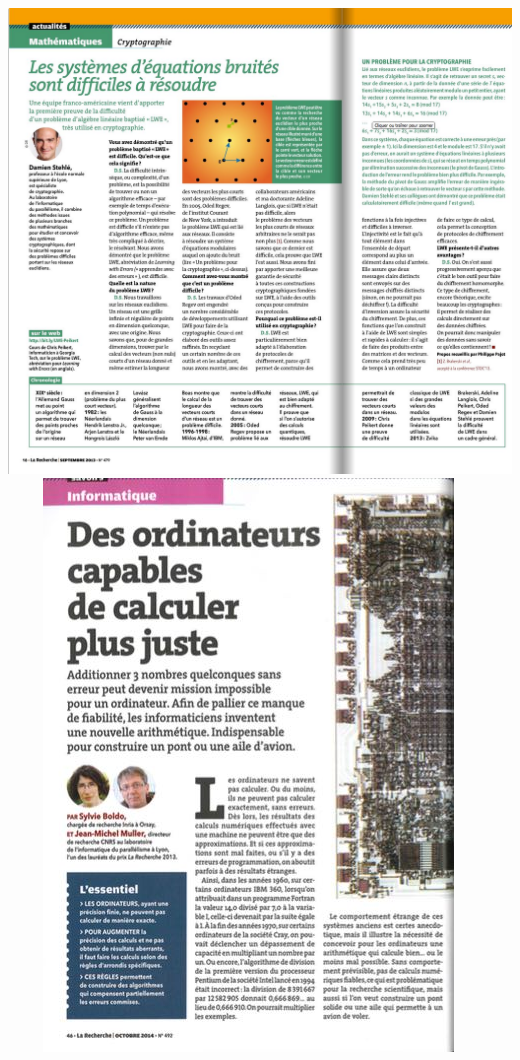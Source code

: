 \documentclass[mathsans]{beamer}
\begin{document}
\begin{frame}
\begin{minipage}{7cm}
 \includegraphics[scale=0.08]{Figures/StehleLaRecherche.jpg}~~~~~\includegraphics[scale=0.19]{Figures/MullerLaRecherche.jpg}
 \end{minipage}
 \end{frame}
\end{document}
